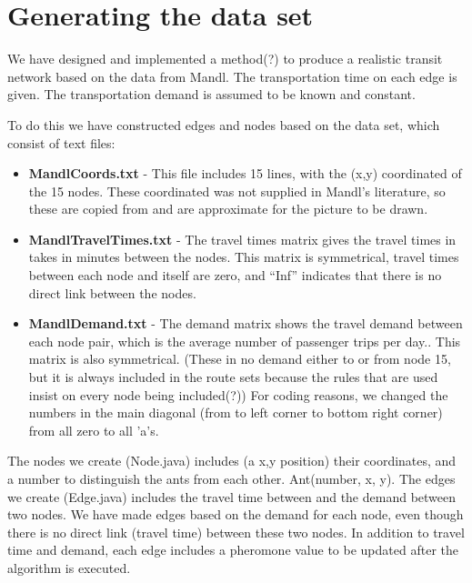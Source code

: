 \section{Generating the data set}


We have designed and implemented a method(?) to produce a realistic transit network based on the data from Mandl. The transportation time on each edge is given. The transportation demand is assumed to be known and constant. 

To do this we have constructed edges and nodes based on the data set, which consist of text files:

\begin{itemize}
\item \textbf{MandlCoords.txt} - This file includes 15 lines, with the (x,y) coordinated of the 15 nodes. These coordinated was not supplied in Mandl's literature, so these are copied from \citet{fan09} and are approximate for the picture to be drawn.

\begingroup
\obeyspaces\obeylines
%
\endgroup%

\item \textbf{MandlTravelTimes.txt} - The travel times matrix gives the travel times in takes in minutes between the nodes. This matrix is symmetrical, travel times between each node and itself are zero, and ``Inf'' indicates that there is no direct link between the nodes. 

\begingroup
\obeyspaces\obeylines
%
\endgroup%

\item \textbf{MandlDemand.txt} - The demand matrix shows the travel demand between each node pair, which is the average number of passenger trips per day.. This matrix is also symmetrical. (These in no demand either to or from node 15, but it is always included in the route sets because the rules that are used insist on every node being included(?)) For coding reasons, we changed the numbers in the main diagonal (from to left corner to bottom right corner) from all zero to all ’a’s. 

\begingroup
\obeyspaces\obeylines
%
\endgroup%

\end{itemize}

The nodes we create (Node.java) includes (a x,y position) their coordinates, and a number to distinguish the ants from each other. Ant(number, x, y).
The edges we create (Edge.java) includes the travel time between and the demand between two nodes. We have made edges based on the demand for each node, even though there is no direct link (travel time) between these two nodes. %
In addition to travel time and demand, each edge includes a pheromone value to be updated after the algorithm is executed.

